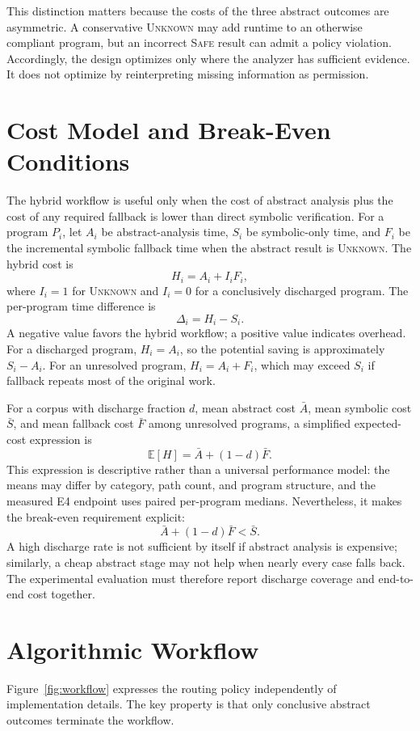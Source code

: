 This distinction matters because the costs of the three abstract outcomes are asymmetric. A conservative \textsc{Unknown} may add runtime to an otherwise compliant program, but an incorrect \textsc{Safe} result can admit a policy violation. Accordingly, the design optimizes only where the analyzer has sufficient evidence. It does not optimize by reinterpreting missing information as permission.

\section{Cost Model and Break-Even Conditions}
The hybrid workflow is useful only when the cost of abstract analysis plus the cost of any required fallback is lower than direct symbolic verification. For a program $P_i$, let $A_i$ be abstract-analysis time, $S_i$ be symbolic-only time, and $F_i$ be the incremental symbolic fallback time when the abstract result is \textsc{Unknown}. The hybrid cost is
\[
 H_i = A_i + I_i F_i,
\]
where $I_i=1$ for \textsc{Unknown} and $I_i=0$ for a conclusively discharged program. The per-program time difference is
\[
 \Delta_i = H_i-S_i.
\]
A negative value favors the hybrid workflow; a positive value indicates overhead. For a discharged program, $H_i=A_i$, so the potential saving is approximately $S_i-A_i$. For an unresolved program, $H_i=A_i+F_i$, which may exceed $S_i$ if fallback repeats most of the original work.

For a corpus with discharge fraction $d$, mean abstract cost $\bar{A}$, mean symbolic cost $\bar{S}$, and mean fallback cost $\bar{F}$ among unresolved programs, a simplified expected-cost expression is
\[
 \mathbb{E}[H]=\bar{A}+(1-d)\bar{F}.
\]
This expression is descriptive rather than a universal performance model: the means may differ by category, path count, and program structure, and the measured E4 endpoint uses paired per-program medians. Nevertheless, it makes the break-even requirement explicit:
\[
 \bar{A}+(1-d)\bar{F}<\bar{S}.
\]
A high discharge rate is not sufficient by itself if abstract analysis is expensive; similarly, a cheap abstract stage may not help when nearly every case falls back. The experimental evaluation must therefore report discharge coverage and end-to-end cost together.

\section{Algorithmic Workflow}
Figure~\ref{fig:workflow} expresses the routing policy independently of implementation details. The key property is that only conclusive abstract outcomes terminate the workflow.


